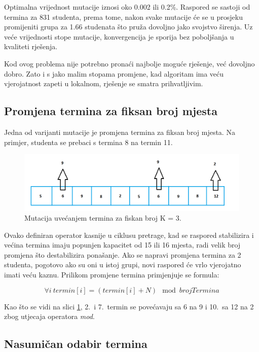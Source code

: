 \documentclass[times, utf8, zavrsni]{fer}
\begin{document}
Optimalna vrijednost mutacije  iznosi oko 0.002 ili 0.2\%. Raspored se sastoji od termina za 831 studenta, prema tome, nakon svake mutacije će se u prosjeku promijeniti grupa za 1.66 studenata što pruža dovoljno jako svojstvo širenja. Uz veće vrijednosti stope mutacije, konvergencija je sporija bez poboljšanja u kvaliteti rješenja.

Kod ovog problema nije potrebno pronaći najbolje moguće rješenje, već dovoljno dobro. Zato i s jako malim stopama promjene, kad algoritam ima veću vjerojatnost zapeti u lokalnom, rješenje se smatra prihvatljivim.

\subsection{Promjena termina za fiksan broj mjesta}

Jedna od varijanti mutacije je promjena termina za fiksan broj mjesta. Na primjer, studenta se prebaci s termina 8 na termin 11.

\begin{figure}[htb]
\centering
\includegraphics[width=15cm]{images/mut_3.png}
\caption{Mutacija uvećanjem termina za fiskan broj K = 3.}
\label{fig:mut_3}
\end{figure}

Ovako definiran operator kasnije u ciklusu pretrage, kad se raspored stabilizira i većina termina imaju popunjen kapacitet od 15 ili 16 mjesta, radi velik broj promjena što destabilizira ponašanje. Ako se napravi promjena termina za 2 studenta, pogotovo ako su oni u istoj grupi, novi raspored će vrlo vjerojatno imati veću kaznu. Prilikom promjene termina primjenjuje se formula:

\begin{equation}
\forall i\ termin[i] = (termin[i] + N)\mod brojTermina
\label{eq:trans-kazne}
\end{equation}

Kao što se vidi na slici \ref{fig:mut_3}, 2.\ i 7.\ termin se povećavaju sa 6 na 9 i 10.\ sa 12 na 2 zbog utjecaja operatora \emph{mod}.

\subsection{Nasumičan odabir termina}
\end{document}
